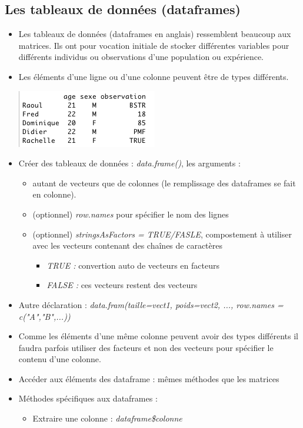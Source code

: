 \documentclass[12pt,a4paper]{article}
\begin{document}
\subsection{Les tableaux de données (dataframes)}
\begin{itemize}
\item Les tableaux de données (dataframes en anglais) ressemblent beaucoup aux matrices. Ils ont pour vocation initiale de stocker différentes variables pour différents individus ou observations d'une population ou expérience.
\item Les éléments d'une ligne ou d'une colonne peuvent être de types différents.
\begin{flushleft}
\includegraphics[scale=0.5]{dataframes}
\end{flushleft}
\item Créer des tableaux de données : \textit{data.frame()}, les arguments : 
\begin{itemize}
\item autant de vecteurs que de colonnes (le remplissage des dataframes se fait en colonne).
\item (optionnel) \textit{row.names} pour spécifier le nom des lignes
\item (optionnel) \textit{stringsAsFactors = TRUE/FASLE}, compostement à utiliser avec les vecteurs contenant des chaînes de caractères
\begin{itemize}
\item \textit{TRUE : } convertion auto de vecteurs en facteurs
\item \textit{FALSE : } ces vecteurs restent des vecteurs
\end{itemize}
\end{itemize}
\item Autre déclaration : 
\newline \textit{data.fram(taille=vect1, poids=vect2, ..., row.names = c("A","B",...))}
\item Comme les éléments d'une même colonne peuvent avoir des types différents il faudra parfois utiliser des facteurs et non des vecteurs pour spécifier le contenu d'une colonne.
\item Accéder aux éléments des dataframe : mêmes méthodes que les matrices
\item Méthodes spécifiques aux dataframes : 
\begin{itemize}
\item Extraire une colonne : \textit{dataframe\$colonne}
\end{itemize}
\end{itemize}
\end{document}

